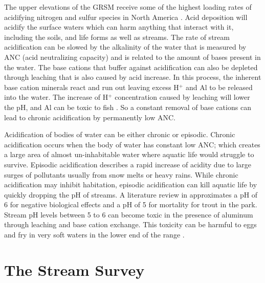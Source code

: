 The upper elevations of the GRSM receive some of the highest loading rates of acidifying nitrogen and sulfur species in North America \citep{johnson1992atmospheric}.  
Acid deposition will acidify the surface waters which can harm anything that interact with it, including the soils, and life forms as well as streams.
The rate of stream acidification can be slowed by the alkalinity of the water that is measured by ANC (acid neutralizing capacity) and is related to the amount of bases present in the water.
The base cations that buffer against acidification can also be depleted through leaching that is also caused by acid increase.
In this process, the inherent base cation minerals react and run out leaving excess H$^+$ and Al to be released into the water\citep{sullivan2004}.
The increase of H$^+$ concentration caused by leaching will lower the pH, and Al can be toxic to fish \citep{driscoll2003effects}.
So a constant removal of base cations can lead to chronic acidification by permanently low ANC.

Acidification of bodies of water can be either chronic or episodic. 
Chronic acidification occurs when the body of water has constant low ANC; which creates a large area of  almost un-inhabitable water where aquatic life would struggle to survive. 
Episodic acidification describes a rapid increase of acidity due to large surges of pollutants usually from snow melts or heavy rains.  
While chronic acidification may inhibit habitation, episodic acidification can kill aquatic life by quickly dropping the pH of streams.
A literature review in \citet{neff2009physiological} approximates a pH of 6 for negative biological effects and a pH of 5 for mortality for trout in the park.  
Stream pH levels between 5 to 6 can become toxic in the presence of aluminum through leaching and base cation exchange.
This toxicity can be harmful to eggs and fry in very soft waters in the lower end of the range \citep{robinson2008ph}.  


\section{The Stream Survey} 

